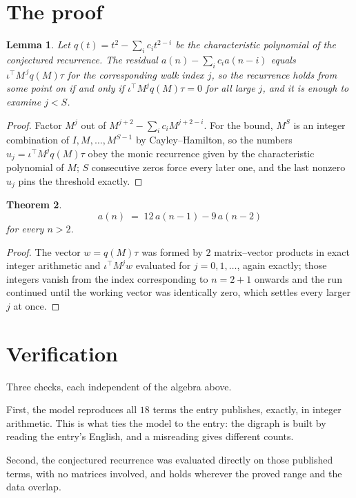 \documentclass[11pt,a4paper]{article}
\theoremstyle{plain}
\newtheorem{theorem}{Theorem}
\newtheorem{lemma}[theorem]{Lemma}
\theoremstyle{definition}
\begin{document}
\section{The proof}

\begin{lemma}\label{lem:crit}
Let $q(t)=t^{2}-\sum_i c_it^{2-i}$ be the characteristic polynomial of the
conjectured recurrence. The residual $a(n)-\sum_ic_ia(n-i)$ equals
$\iota^{\!\top}M^{\,j}q(M)\tau$ for the corresponding walk index $j$, so the recurrence
holds from some point on if and only if $\iota^{\!\top}M^{j}q(M)\tau=0$ for all large $j$,
and it is enough to examine $j<S$.
\end{lemma}

\begin{proof}
Factor $M^{j}$ out of $M^{j+2}-\sum_ic_iM^{j+2-i}$. For the bound, $M^{S}$
is an integer combination of $I,M,\dots,M^{S-1}$ by Cayley--Hamilton, so the numbers
$u_j=\iota^{\!\top}M^{j}q(M)\tau$ obey the monic recurrence given by the characteristic
polynomial of $M$; $S$ consecutive zeros force every later one, and the last nonzero $u_j$
pins the threshold exactly.
\end{proof}

\begin{theorem}
\[
a(n)\;=\;12\,a(n-1) - 9\,a(n-2)
\]
for every $n>2$.
\end{theorem}

\begin{proof}
The vector $w=q(M)\tau$ was formed by $2$ matrix--vector products in exact integer
arithmetic and $\iota^{\!\top}M^{j}w$ evaluated for $j=0,1,\dots$, again exactly; those
integers vanish from the index corresponding to $n=2+1$ onwards and the run continued
until the working vector was identically zero, which settles every larger $j$ at once.
\end{proof}

\section{Verification}

Three checks, each independent of the algebra above.

First, the model reproduces all $18$ terms the entry publishes, exactly, in integer
arithmetic. This is what ties the model to the entry: the digraph is built by reading the
entry's English, and a misreading gives different counts.

Second, the conjectured recurrence was evaluated directly on those published terms, with no
matrices involved, and holds wherever the proved range and the data overlap.
\end{document}
